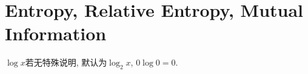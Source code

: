 \chapter{Entropy, Relative Entropy, Mutual Information}

$\log x$若无特殊说明, 默认为$\log_2 x$, $0\log 0=0$.


